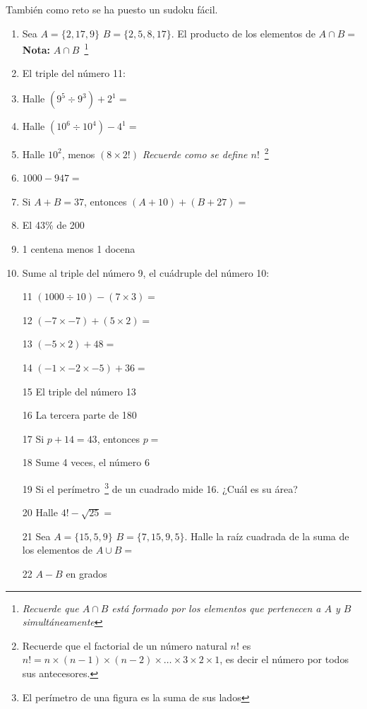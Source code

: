 \documentclass[10pt,twoside,letterpaper]{article}
\begin{document}
También como reto se ha puesto un sudoku fácil.
\begin{enumerate}
  \item Sea $ A=\{2,17,9\} $ $ B=\{2,5,8,17\} $. El producto de los elementos de $ A\cap B= $\\ \textbf{Nota:} $A\cap B$~\footnote{\emph{Recuerde que $A\cap B$ está formado por los elementos que pertenecen a $A$ y $B$ simultáneamente}}
 \item El triple del número 11:
  \item Halle $ (9^5\div9^3)+2^1= $
  \item Halle $ (10^6\div10^4)-4^1= $
  \item Halle $ 10^2 $, menos $ (8\times2!)$ \textit{Recuerde como se define $n!$}~\footnote{Recuerde que el factorial de un número natural $ n! $ es $ n!=n\times(n-1)\times(n-2)\times\ldots\times3\times2\times1 $, es decir el número por todos sus antecesores.} 
  \item $ 1000-947= $
  \item Si $A+B=37$, entonces $(A+10)+(B+27)=$
  \item El 43\% de 200
  \item 1 centena menos 1 docena 
  \item Sume al triple del número 9, el cuádruple del número 10:
  \item[11] $ (1000\div10)-(7\times3)= $
  \item[12] $ (-7\times-7)+(5\times2)= $
  \item[13] $ (-5\times2)+48= $
  \item[14] $ (-1\times-2\times-5)+36= $
  \item[15] El triple del número 13
  \item[16] La tercera parte de 180
  \item[17] Si $p+14=43$, entonces $p=$
  \item[18] Sume 4 veces, el número 6
  \item[19] Si el perímetro~\footnote{El perímetro de una figura es la suma de sus lados} de un cuadrado mide 16. ¿Cuál es su área?
  \item[20] Halle $ 4!-\sqrt{25}= $
  \item[21] Sea $ A=\{15,5,9\} $ $ B=\{7,15,9,5\} $. Halle la raíz cuadrada de la suma de los elementos de $ A\cup B= $
  \item[22] $A-B$ en grados
  \usetikzlibrary{arrows}
\begin{tikzpicture}[line cap=round,line join=round,>=triangle 45,x=1.0cm,y=1.0cm,scale=1.5]

\end{tikzpicture}
\end{enumerate}
\end{document}
